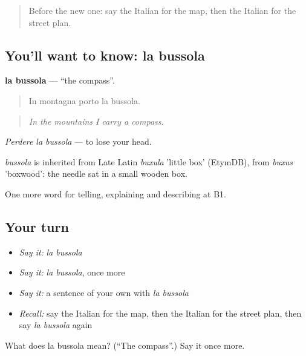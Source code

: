 \label{lesson:IT-C439-bussola}



\begin{quote}
Before the new one: say the Italian for the map, then the Italian for the street plan.
\end{quote}

\subsection*{You'll want to know: la bussola}
\textbf{la bussola} — \textquotedblleft{}the compass\textquotedblright{}.

\begin{quote}
In montagna porto la bussola.
\end{quote}

\begin{quote}
\emph{In the mountains I carry a compass.}
\end{quote}

\emph{Perdere la bussola} — to lose your head.

\begin{cousinweb}
\emph{bussola} is inherited from Late Latin \emph{buxula} 'little box' (EtymDB), from \emph{buxus} 'boxwood': the needle sat in a small wooden box.
\end{cousinweb}

\begin{grammarlens}[title={What you've built}]
One more word for telling, explaining and describing at B1.
\end{grammarlens}

\subsection*{Your turn}
\begin{itemize}
\raggedright
  \item \emph{Say it:} \emph{la bussola}
  \item \emph{Say it:} \emph{la bussola}, once more
  \item \emph{Say it:} a sentence of your own with \emph{la bussola}
  \item \emph{Recall:} say the Italian for the map, then the Italian for the street plan, then say \emph{la bussola} again
\end{itemize}

\begin{tcolorbox}[breakable,colback=teal!4,colframe=teal!35!black,title={Before you move on}]
What does la bussola mean? (\textquotedblleft{}The compass\textquotedblright{}.) Say it once more.
\end{tcolorbox}
